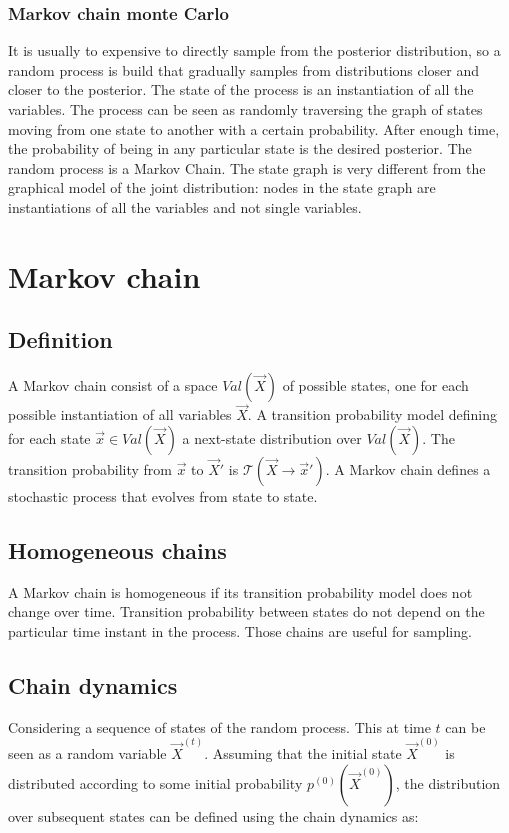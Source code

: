 		\subsubsection{Markov chain monte Carlo}
		It is usually to expensive to directly sample from the posterior distribution, so a random process is build that gradually samples from distributions closer and closer to the posterior.
		The state of the process is an instantiation of all the variables.
		The process can be seen as randomly traversing the graph of states moving from one state to another with a certain probability.
		After enough time, the probability of being in any particular state is the desired posterior.
		The random process is a Markov Chain.
		The state graph is very different from the graphical model of the joint distribution: nodes in the state graph are instantiations of all the variables and not single variables.

\section{Markov chain}

	\subsection{Definition}
	A Markov chain consist of a space $Val(\vec{X})$ of possible states, one for each possible instantiation of all variables $\vec{X}$.
	A transition probability model defining for each state $\vec{x}\in Val(\vec{X})$ a next-state distribution over $Val(\vec{X})$.
	The transition probability from $\vec{x}$ to $\vec{X}'$ is $\mathcal{T}(\vec{X}\rightarrow\vec{x}')$.
	A Markov chain defines a stochastic process that evolves from state to state.

	\subsection{Homogeneous chains}
	A Markov chain is homogeneous if its transition probability model does not change over time.
	Transition probability between states do not depend on the particular time instant in the process.
	Those chains are useful for sampling.

	\subsection{Chain dynamics}
	Considering a sequence of states of the random process.
	This at time $t$ can be seen as a random variable $\vec{X}^{(t)}$.
	Assuming that the initial state $\vec{X}^{(0)}$ is distributed according to some initial probability $p^{(0)}(\vec{X}^{(0)})$, the distribution over subsequent states can be defined using the chain dynamics as:

